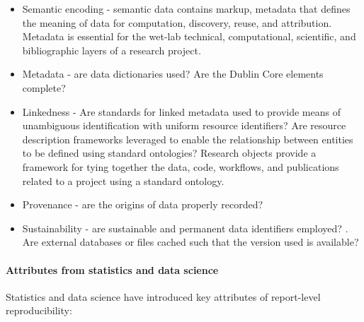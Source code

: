 \documentclass{drexelthesis}
\begin{document}
\begin{itemize}
	\item Semantic encoding  - semantic data contains markup, metadata that defines the meaning of data for computation, discovery, reuse, and attribution. Metadata is essential for the wet-lab technical, computational, scientific, and bibliographic layers of a research project.

	\item Metadata - are data dictionaries used? Are the Dublin Core elements complete?

	\item Linkedness - Are standards for linked metadata used to provide means of unambiguous identification with uniform resource identifiers? Are resource description frameworks leveraged to enable the relationship between entities to be defined using standard ontologies? Research objects \cite{Bechhofer2010-lr} provide a framework for tying together the data, code, workflows, and publications related to a project using a standard ontology.

	\item Provenance - are the origins of data properly recorded? \cite{Herschel2017-yc}

	\item Sustainability - are sustainable and permanent data identifiers employed? \cite{Gomez-Perez2013-th,Zhao2012-ou}. Are external databases or files cached such that the version used is available?

\end{itemize}
\paragraph{Attributes from statistics and data science}

Statistics and data science have introduced key attributes of report-level reproducibility:
\end{document}
